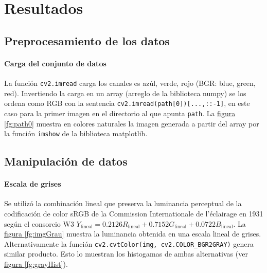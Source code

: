 \documentclass{article}
\begin{document}
\section{Resultados}

\subsection{Preprocesamiento de los datos}

\paragraph{Carga del conjunto de datos} 
La función \verb'cv2.imread' carga los canales es azúl, verde, rojo (BGR: blue, green, red).
Invertiendo la carga en un array (arreglo de la biblioteca numpy) se los ordena como RGB con la sentencia \verb'cv2.imread(path[0])[...,::-1]', en este caso para la primer imagen en el directorio al que apunta \verb'path'.
La \hyperref[fg:path0]{figura \ref*{fg:path0}} muestra en colores naturales la imagen generada a partir del array por la función \verb'imshow' de la biblioteca matplotlib.




\subsection{Manipulación de datos}

\paragraph{Escala de grises}
Se utilizó la combinación lineal que preserva la luminancia perceptual de la codificación de color sRGB de la Commission Internationale de l'éclairage en 1931 según el consorcio W3 \cite{noauthor_standard_1996} $
Y_\mathrm{lineal} = 0.2126 R_\mathrm{lineal} + 0.7152 G_\mathrm{lineal} + 0.0722 B_\mathrm{lineal} .
$
La \hyperref[fg:imgGrau]{figura \ref*{fg:imgGrau}} muestra la luminancia obtenida en una escala lineal de grises.
Alternativamente la función \verb'cv2.cvtColor(img, cv2.COLOR_BGR2GRAY)' genera similar producto.
Esto lo muestran los histogamas de ambas alternativas (ver \hyperref[fg:grayHist]{figura \ref*{fg:grayHist}}).
\end{document}

